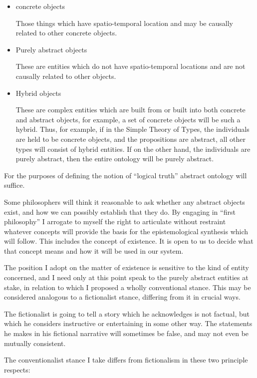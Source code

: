 \documentclass[10pt,titlepage]{book}
\begin{document}
\begin{itemize}

\item concrete objects

  Those things which have spatio-temporal location and may be causally related to other concrete objects.

\item Purely abstract objects

  These are entities which do not have spatio-temporal locations and are not causally related to other objects.

\item Hybrid objects

  These are complex entities which are built from or built into both concrete and abstract objects, for example, a set of concrete objects will be such a hybrid.
  Thus, for example, if in the Simple Theory of Types, the individuals are held to be concrete objects, and the propositions are abstract, all other types will consist of hybrid entities.
  If on the other hand, the individuals are purely abstract, then the entire ontology will be purely abstract.
\end{itemize}

For the purposes of defining the notion of ``logical truth'' abstract ontology will suffice.

Some philosophers will think it reasonable to ask whether any abstract objects exist, and how we can possibly establish that they do.
By engaging in ``first philosophy'' I arrogate to myself the right to articulate without restraint whatever concepts will provide the basis for the epistemological synthesis which will follow.
This includes the concept of existence.
It is open to us to decide what that concept means and how it will be used in our system.

The position I adopt on the matter of existence is sensitive to the kind of entity concerned, and I need only at this point speak to the purely abstract entities at stake, in relation to which I proposed a wholly conventional stance.
This may be considered analogous to a fictionalist stance, differing from it in crucial ways.

The fictionalist is going to tell a story which he acknowledges is not factual, but which he considers instructive or entertaining in some other way.
The statements he makes in his fictional narrative will sometimes be false, and may not even be mutually consistent.

The conventionalist stance I take differs from fictionalism in these two principle respects:
\end{document}
